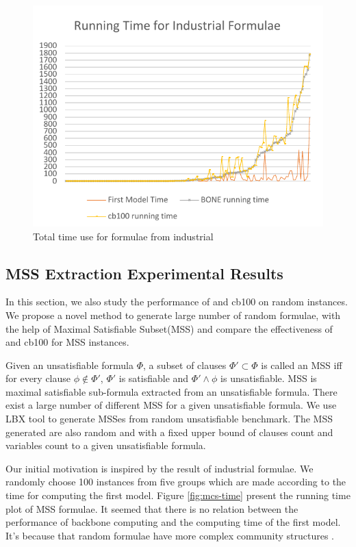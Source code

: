 \begin{figure}
    \centering
    \includegraphics[scale=0.7]{ind2.pdf}
   \caption{Total time use for formulae from industrial}
   \label{fig:ind-time}
\end{figure}

\subsection{MSS Extraction Experimental Results}
In this section, we also study the performance of \tool and cb100 on random instances.
We propose a novel method to generate large number of random formulae, with the help of Maximal Satisfiable Subset(MSS) and compare the effectiveness of \tool and cb100 for MSS instances.

Given an unsatisfiable formula $\Phi$, a subset of clauses $\Phi'\subset\Phi$ is called an MSS iff for every clause $\phi\notin\Phi'$, $\Phi'$ is satisfiable and $\Phi'\wedge\phi$ is unsatisfiable. MSS is maximal satisfiable sub-formula extracted from an unsatisfiable formula. There exist a large number of different MSS for a given unsatisfiable formula. We use LBX tool to generate MSSes from random unsatisfiable benchmark. The MSS generated are also random and with a fixed upper bound of clauses count and variables count to a given unsatisfiable formula.

Our initial motivation is inspired by the result of industrial formulae. 
We randomly choose 100 instances from five groups which are made according to the time for computing the first model. Figure \ref{fig:mcs-time} present the running time plot of MSS formulae. It seemed that there is no relation between the performance of backbone computing and the computing time of the first model.
It's because that random formulae have more complex community structures \cite{NZG2014,LJG2015SAT,LJG015}. 

